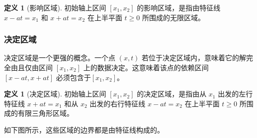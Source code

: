 \documentclass[12pt,a4paper]{article}
\numberwithin{subsection}{section}   %
\numberwithin{subsubsection}{subsection}
\theoremstyle{plain}
\theoremstyle{definition}
\newtheorem{definition}[theorem]{定义}
\theoremstyle{remark}
\theoremstyle{remark}
\begin{document}
\begin{definition}[影响区域]
	初始轴上区间 \([x_1, x_2]\) 的影响区域，是指由特征线 \(x-at=x_1\) 和 \(x+at=x_2\) 在上半平面 \(t \ge 0\) 所围成的无限区域。
\end{definition}

\subsubsection{决定区域 }
决定区域是一个更强的概念。一个点 \((x,t)\) 若位于决定区域内，意味着它的解完全由且仅由区间 \([x_1, x_2]\) 上的数据决定。这意味着该点的依赖区间 \([x-at, x+at]\) 必须包含于\([x_1, x_2]\)。

\begin{definition}[决定区域]
	初始轴上区间 \([x_1, x_2]\) 的决定区域，是指由从 \(x_1\) 出发的左行特征线 \(x+at=x_1\) 和从 \(x_2\) 出发的右行特征线 \(x-at=x_2\) 在上半平面 \(t \ge 0\) 所围成的有限三角形区域。
\end{definition}

如下图所示，这些区域的边界都是由特征线构成的。
\end{document}
